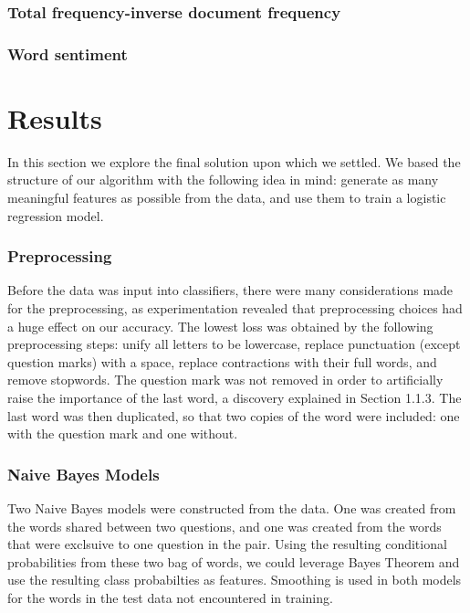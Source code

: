 \documentclass{article}
\begin{document}
\subsubsection{Total frequency-inverse document frequency}

\subsubsection{Word sentiment}

\section{Results}

In this section we explore the final solution upon which we settled. We based
the structure of our algorithm with the following idea in mind: generate as many
meaningful features as possible from the data, and use them to train a logistic
regression model.

\subsubsection{Preprocessing}

Before the data was input into classifiers, there were many considerations made
for the preprocessing, as experimentation revealed that preprocessing choices
had a huge effect on our accuracy. The lowest loss was obtained by the following
preprocessing steps: unify all letters to be lowercase, replace punctuation
(except question marks) with a space, replace contractions with their full words,
and remove stopwords. The question mark was not removed in order to artificially
raise the importance of the last word, a discovery explained in Section 1.1.3.
The last word was then duplicated, so that two copies of the word were included:
one with the question mark and one without.

\subsubsection{Naive Bayes Models}

Two Naive Bayes models were constructed from the data. One was created from the
words shared between two questions, and one was created from the words that were
exclsuive to one question in the pair. Using the resulting conditional
probabilities from these two bag of words, we could leverage Bayes Theorem and
use the resulting class probabilties as features. Smoothing is used in both
models for the words in the test data not encountered in training.
\end{document}
